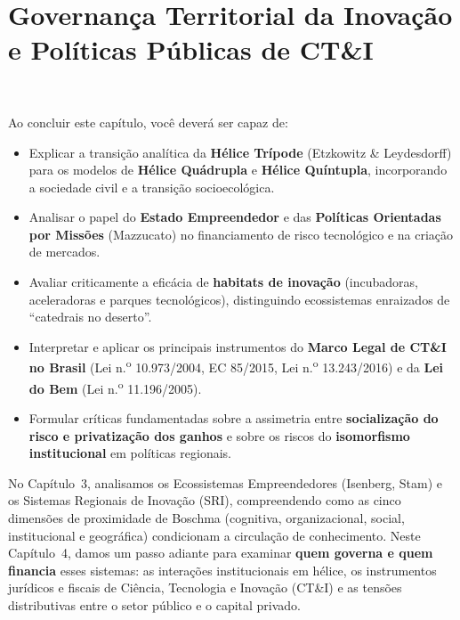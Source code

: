 \chapter{Governança Territorial da Inovação e Políticas Públicas de CT\&I}
\label{cap:unid1_cap04}

\noindent{}\ \tagCritico

\vspace{6pt}

\begin{capObjetivos}
Ao concluir este capítulo, você deverá ser capaz de:
\begin{itemize}[leftmargin=1.4em, itemsep=3pt]
  \item Explicar a transição analítica da \textbf{Hélice Trípode} (Etzkowitz \& Leydesdorff) para os modelos de \textbf{Hélice Quádrupla} e \textbf{Hélice Quíntupla}, incorporando a sociedade civil e a transição socioecológica.
  \item Analisar o papel do \textbf{Estado Empreendedor} e das \textbf{Políticas Orientadas por Missões} (Mazzucato) no financiamento de risco tecnológico e na criação de mercados.
  \item Avaliar criticamente a eficácia de \textbf{habitats de inovação} (incubadoras, aceleradoras e parques tecnológicos), distinguindo ecossistemas enraizados de ``catedrais no deserto''.
  \item Interpretar e aplicar os principais instrumentos do \textbf{Marco Legal de CT\&I no Brasil} (Lei n.\textsuperscript{o} 10.973/2004, EC 85/2015, Lei n.\textsuperscript{o} 13.243/2016) e da \textbf{Lei do Bem} (Lei n.\textsuperscript{o} 11.196/2005).
  \item Formular críticas fundamentadas sobre a assimetria entre \textbf{socialização do risco e privatização dos ganhos} e sobre os riscos do \textbf{isomorfismo institucional} em políticas regionais.
\end{itemize}
\end{capObjetivos}

\begin{capRevisao}
No Capítulo~3, analisamos os Ecossistemas Empreendedores (Isenberg, Stam) e os Sistemas Regionais de Inovação (SRI), compreendendo como as cinco dimensões de proximidade de Boschma (cognitiva, organizacional, social, institucional e geográfica) condicionam a circulação de conhecimento. Neste Capítulo~4, damos um passo adiante para examinar \textbf{quem governa e quem financia} esses sistemas: as interações institucionais em hélice, os instrumentos jurídicos e fiscais de Ciência, Tecnologia e Inovação (CT\&I) e as tensões distributivas entre o setor público e o capital privado.
\end{capRevisao}

